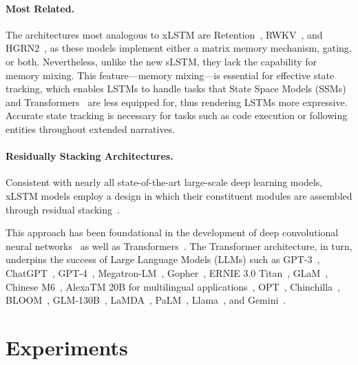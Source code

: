 \paragraph{Most Related.} The architectures most analogous to xLSTM are Retention~\citep{Sun:23arxiv}, RWKV~\citep{Peng:23arxivshort,Peng:24arxivshort}, and HGRN2~\citep{Qin:24arxiv}, as these models implement either a matrix memory mechanism, gating, or both. Nevertheless, unlike the new sLSTM, they lack the capability for memory mixing. This feature—memory mixing—is essential for effective state tracking, which enables LSTMs to handle tasks that State Space Models (SSMs) and Transformers~\citep{Merrill:24,Deletang:23} are less equipped for, thus rendering LSTMs more expressive. Accurate state tracking is necessary for tasks such as code execution or following entities throughout extended narratives.

\paragraph{Residually Stacking Architectures.} Consistent with nearly all state-of-the-art large-scale deep learning models, xLSTM models employ a design in which their constituent modules are assembled through residual stacking~\citep{Srivastava:15,He:16}.

This approach has been foundational in the development of deep convolutional neural networks~\citep{He:16} as well as Transformers~\citep{Vaswani:17}. The Transformer architecture, in turn, underpins the success of Large Language Models (LLMs) such as GPT-3~\citep{Brown:20short}, ChatGPT~\citep{Schulman:22short}, GPT-4~\citep{Achiam:23gpt4short}, Megatron-LM~\citep{Shoeybi:19}, Gopher~\citep{Rae:21short}, ERNIE 3.0 Titan~\citep{Wang:21arxivshort}, GLaM~\citep{Du:21glamshort}, Chinese M6~\citep{Lin:21}, AlexaTM 20B for multilingual applications~\citep{Soltan:22}, OPT~\citep{Zhang:22opt}, Chinchilla~\citep{Hoffmann:22short}, BLOOM~\citep{Scao:22arxivshort}, GLM-130B~\citep{Zeng:22arxivshort}, LaMDA~\citep{Thoppilan:22short}, PaLM~\citep{Chowdhery:22short}, Llama~\citep{Touvron:23arxiv}, and Gemini~\citep{GeminiTeam:23arxiv,Reid:24arxiv}.

\section{Experiments}
\label{sec:Exp}

